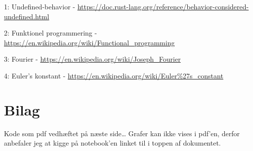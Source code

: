 \documentclass[11pt,a4paper]{article}
\begin{document}
1: Undefined-behavior - \url{https://doc.rust-lang.org/reference/behavior-considered-undefined.html}

2: Funktionel programmering - \url{https://en.wikipedia.org/wiki/Functional\_programming}

3: Fourier - \url{https://en.wikipedia.org/wiki/Joseph\_Fourier}

4: Euler's konstant - \url{https://en.wikipedia.org/wiki/Euler\%27s\_constant}


\section{Bilag}
\label{sec:orgc3ace50}

Kode som pdf vedhæftet på næste side\ldots{}
Grafer kan ikke vises i pdf'en, derfor anbefaler jeg at kigge på notebook'en linket til i toppen af dokumentet.


\end{document}
